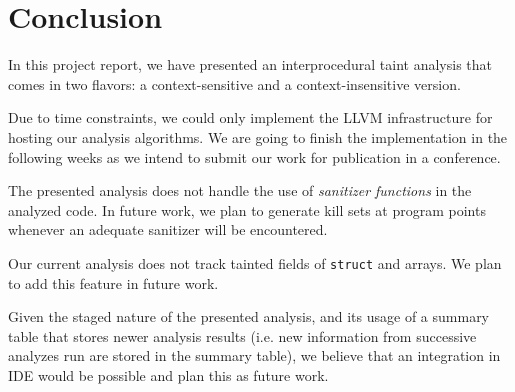 \section{Conclusion}\label{sec:conclusion}

In this project report, we have presented an interprocedural
taint analysis that comes in two flavors: a context-sensitive
and a context-insensitive version.

Due to time constraints, we could only implement the
LLVM infrastructure for hosting our analysis algorithms.
We are going to finish the implementation in the following
weeks as we intend to submit our work for publication
in a conference.

The presented analysis does not handle the use of
\textit{sanitizer functions} in the analyzed code.
In future work, we plan to generate kill sets at
program points whenever an adequate sanitizer will
be encountered.

Our current analysis does not track tainted fields of
\texttt{struct} and arrays. We plan to add this feature
in future work.

Given the staged nature of the presented analysis, and its
usage of a summary table that stores newer analysis results
(i.e. new information from successive analyzes run are stored
in the summary table), we believe that an integration in IDE
would be possible and plan this as future work.